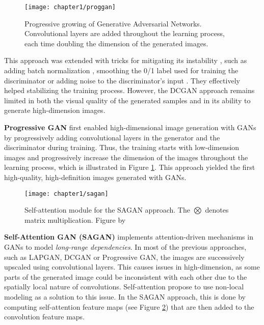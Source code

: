 \begin{figure}
	\centering
	\texttt{[image: chapter1/proggan]}
	\caption[Progressive growing of Generative Adversarial Networks]{Progressive growing of Generative Adversarial Networks. Convolutional layers are added throughout the learning process, each time doubling the dimension of the generated images.}
	\label{fig:proggan}
\end{figure}

This approach was extended  with tricks for mitigating its instability \citep{Salimans2016}, such as adding batch normalization \citep{Ioffe2015}, smoothing the 0/1 label used for training the discriminator or adding noise to the discriminator's input \citep{Sonderby2017}. They effectively helped stabilizing the training process. However, the \ac{DCGAN} approach remains limited in both the visual quality of the generated samples and in its ability to generate high-dimension images.

\textbf{Progressive GAN} \citep{Karras2017} first enabled high-dimensional image generation with GANs by progressively adding convolutional layers in the generator and the discriminator during training. Thus, the training starts with low-dimension images and progressively increase the dimension of the images throughout the learning process, which is illustrated in Figure \ref{fig:proggan}. This approach yielded the first high-quality, high-definition images generated with \ac{GANs}.

\begin{figure}
	\centering
	\texttt{[image: chapter1/sagan]}
	\caption[Self-attention module]{Self-attention module for the SAGAN approach. The $\bigotimes$ denotes matrix multiplication. Figure by \citet{Zhang2018}}
	\label{fig:sagan}
\end{figure}

\textbf{Self-Attention GAN (SAGAN)} \citep{Zhang2018} implements attention-driven  mechanisms in \ac{GANs} to model \textit{long-range dependencies}. In most of the previous approaches, such as LAPGAN, DCGAN or Progressive GAN, the images are successively upscaled using convolutional layers. This causes issues in high-dimension, as some parts of the generated image could be inconsistent with each other due to the spatially local nature of convolutions. Self-attention propose to use non-local modeling as a solution to this issue. In the SAGAN approach, this is done by computing self-attention feature maps (see Figure \ref{fig:sagan}) that are then added to the convolution feature maps. 

